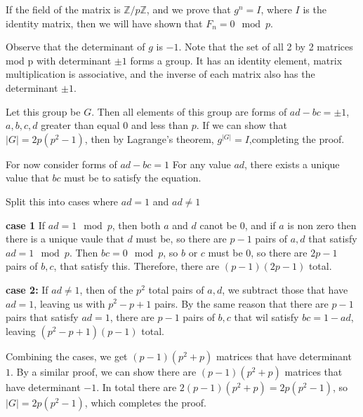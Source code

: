 \documentclass{article}
\begin{document}
If the field of the matrix is $\mathbb{Z} / p \mathbb{Z}$, and we prove
that $g^n = I$, where $I$ is the identity matrix, then we will have shown that
$F_n = 0 \mod p$.


Observe that the determinant of $g$  is $-1$. Note that the set of all 2 by 2 matrices 
mod p
with determinant $\pm 1$ forms a group. It has an identity element,
matrix multiplication is associative, and the inverse of each matrix 
also has the determinant $\pm 1$.  

Let this group be $G$.  Then all elements of this group are forms of $ad - bc = \pm 1$,
$a, b, c, d $ greater than equal $0$ and  less than $p$. If we can show that 
$|G| = 2p(p^2 - 1)$, then by Lagrange's theorem, $g^{|G|} = I$,completing the proof.


For now consider forms of $ad - bc = 1$
For any value $ad$, there exists a unique value that $bc$ must be to
satisfy the equation.

Split this into cases where $ad = 1$ and $ad \ne 1$

\textbf{case 1}
If $ad = 1 \mod p$, then both $a$ and $d$ canot be $0$, and if $a$ is non zero
then there is a unique vaule that $d$ must be, so there are $p - 1$ pairs of $a, d$
that satisfy $ad = 1 \mod p$.  Then $bc = 0 \mod p$, so $b$ or $c$ must be $0$, so
there are $2p - 1$ pairs of $b, c$, that satisfy this.  Therefore, there are
$(p - 1)(2p - 1)$ total.

\textbf{case 2:}
If $ad \ne 1$, then of the $p^2$ total pairs of $a, d$, we subtract those that have
$ad = 1$, leaving us with $p^2 - p + 1$ pairs.  By the same reason that 
there are $p - 1$ pairs that satisfy $ad = 1$, there are $p -1$ pairs of $b, c$ 
that wil satisfy $bc = 1 - ad$, leaving $(p^2 - p + 1)(p - 1)$ total.

Combining the cases, we get $(p - 1)(p^2 + p)$ matrices that have determinant $1$.
By a similar proof, we can show there are $(p - 1)(p^2 + p)$ matrices that have
determinant $-1$.  In total there are $2(p-1)(p^2 + p) = 2p(p^2 - 1)$, so 
$|G| = 2p(p^2 - 1)$, which completes the proof.
\end{document}
